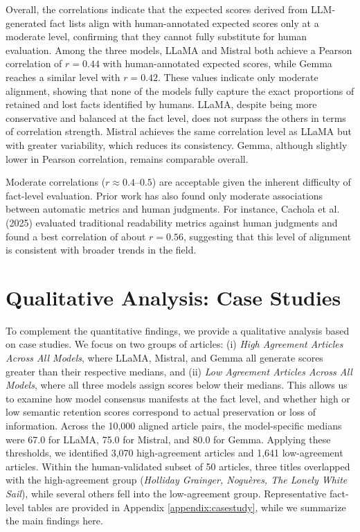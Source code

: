 \documentclass{DESSThesis}
\begin{document}
Overall, the correlations indicate that the expected scores derived from LLM-generated fact lists align with human-annotated expected scores only at a moderate level, confirming that they cannot fully substitute for human evaluation. Among the three models, LLaMA and Mistral both achieve a Pearson correlation of $r = 0.44$ with human-annotated expected scores, while Gemma reaches a similar level with $r = 0.42$. These values indicate only moderate alignment, showing that none of the models fully capture the exact proportions of retained and lost facts identified by humans. LLaMA, despite being more conservative and balanced at the fact level, does not surpass the others in terms of correlation strength. Mistral achieves the same correlation level as LLaMA but with greater variability, which reduces its consistency. Gemma, although slightly lower in Pearson correlation, remains comparable overall.

Moderate correlations ($r \approx 0.4$–$0.5$) are acceptable given the inherent difficulty of fact-level evaluation. Prior work has also found only moderate associations between automatic metrics and human judgments. For instance, Cachola et al. (2025)\cite{cachola2025evaluating} evaluated traditional readability metrics against human judgments and found a best correlation of about $r = 0.56$, suggesting that this level of alignment is consistent with broader trends in the field.

\section{Qualitative Analysis: Case Studies}
\label{sec:case_study}
To complement the quantitative findings, we provide a qualitative analysis based on case studies. 
We focus on two groups of articles: (i) \textit{High Agreement Articles Across All Models}, where LLaMA, Mistral, and Gemma all generate scores greater than their respective medians, and (ii) \textit{Low Agreement Articles Across All Models}, where all three models assign scores below their medians. 
This allows us to examine how model consensus manifests at the fact level, and whether high or low semantic retention scores correspond to actual preservation or loss of information. 
Across the 10,000 aligned article pairs, the model-specific medians were 67.0 for LLaMA, 75.0 for Mistral, and 80.0 for Gemma. 
Applying these thresholds, we identified 3,070 high-agreement articles and 1,641 low-agreement articles. 
Within the human-validated subset of 50 articles, three titles overlapped with the high-agreement group (\textit{Holliday Grainger, Noguères, The Lonely White Sail}), while several others fell into the low-agreement group. 
Representative fact-level tables are provided in Appendix \ref{appendix:casestudy}, while we summarize the main findings here.
\end{document}
